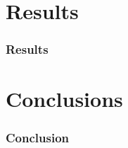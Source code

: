 



\section{Results}

\begin{frame}
    \frametitle{Results}
\end{frame}






\section{Conclusions}

\begin{frame}
    \frametitle{Conclusion}
\end{frame}




